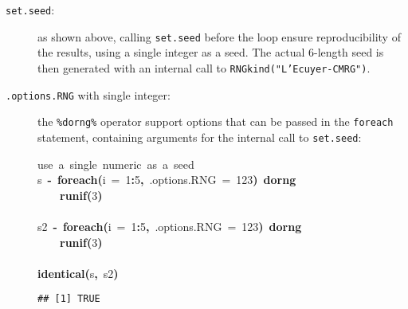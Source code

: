 \documentclass[a4paper,12pt]{article}\usepackage{graphicx, color}
\makeatletter
\newcommand{\hlnumber}[1]{\textcolor[rgb]{0,0,0}{#1}}%
\newcommand{\hlfunctioncall}[1]{\textcolor[rgb]{0.501960784313725,0,0.329411764705882}{\textbf{#1}}}%
\newcommand{\hlkeyword}[1]{\textcolor[rgb]{0,0,0}{\textbf{#1}}}%
\newcommand{\hlargument}[1]{\textcolor[rgb]{0.690196078431373,0.250980392156863,0.0196078431372549}{#1}}%
\newcommand{\hlcomment}[1]{\textcolor[rgb]{0.180392156862745,0.6,0.341176470588235}{#1}}%
\newcommand{\hlassignement}[1]{\textcolor[rgb]{0,0,0}{\textbf{#1}}}%
\newcommand{\hlsymbol}[1]{\textcolor[rgb]{0,0,0}{#1}}%
\newcommand{\hlstd}[1]{\textcolor[rgb]{0,0,0}{#1}}%
\newenvironment{kframe}{%
 \def\FrameCommand##1{\hskip\@totalleftmargin \hskip-\fboxsep
 \colorbox{shadecolor}{##1}\hskip-\fboxsep
     \hskip-\linewidth \hskip-\@totalleftmargin \hskip\columnwidth}%
 \MakeFramed {\advance\hsize-\width
   \@totalleftmargin\z@ \linewidth\hsize
   \@setminipage}}%
 {\par\unskip\endMakeFramed}
\newenvironment{knitrout}{}{} %
\renewenvironment{knitrout}{\begin{footnotesize}}{\end{footnotesize}}
\let\code=\texttt
\newcommand{\dorng}{\code{\%dorng\%}\xspace}
\makeatother
\begin{document}
\begin{description}
  \item[\code{set.seed}:] as shown above, calling \code{set.seed} before the
  loop ensure reproducibility of the results, using a single integer as a seed. 
  The actual 6-length seed is then generated with an internal call to 
  \code{RNGkind("L'Ecuyer-CMRG")}.
  \item[\code{.options.RNG} with single integer:] the \dorng operator
  support options that can be passed in the \code{foreach} statement, containing
  arguments for the internal call to \code{set.seed}:
  
\begin{knitrout}
\color{fgcolor}\begin{kframe}
\begin{flushleft}
\ttfamily\noindent
\hlcomment{\usebox{\hlnormalsizeboxhash}{\ }use{\ }a{\ }single{\ }numeric{\ }as{\ }a{\ }seed}\hspace*{\fill}\\
\hlstd{}\hlsymbol{s}{\ }\hlassignement{\usebox{\hlnormalsizeboxlessthan}-}{\ }\hlfunctioncall{foreach}\hlkeyword{(}\hlargument{i}{\ }\hlargument{=}{\ }\hlnumber{1}\hlkeyword{:}\hlnumber{5}\hlkeyword{,}{\ }\hlargument{.options.RNG}{\ }\hlargument{=}{\ }\hlnumber{123}\hlkeyword{)}{\ }\hlkeyword{\usebox{\hlnormalsizeboxpercent}dorng\usebox{\hlnormalsizeboxpercent}}{\ }\hlkeyword{\usebox{\hlnormalsizeboxopenbrace}}\hspace*{\fill}\\
\hlstd{}{\ }{\ }{\ }{\ }\hlfunctioncall{runif}\hlkeyword{(}\hlnumber{3}\hlkeyword{)}\hspace*{\fill}\\
\hlstd{}\hlkeyword{\usebox{\hlnormalsizeboxclosebrace}}\hspace*{\fill}\\
\hlstd{}\hlsymbol{s2}{\ }\hlassignement{\usebox{\hlnormalsizeboxlessthan}-}{\ }\hlfunctioncall{foreach}\hlkeyword{(}\hlargument{i}{\ }\hlargument{=}{\ }\hlnumber{1}\hlkeyword{:}\hlnumber{5}\hlkeyword{,}{\ }\hlargument{.options.RNG}{\ }\hlargument{=}{\ }\hlnumber{123}\hlkeyword{)}{\ }\hlkeyword{\usebox{\hlnormalsizeboxpercent}dorng\usebox{\hlnormalsizeboxpercent}}{\ }\hlkeyword{\usebox{\hlnormalsizeboxopenbrace}}\hspace*{\fill}\\
\hlstd{}{\ }{\ }{\ }{\ }\hlfunctioncall{runif}\hlkeyword{(}\hlnumber{3}\hlkeyword{)}\hspace*{\fill}\\
\hlstd{}\hlkeyword{\usebox{\hlnormalsizeboxclosebrace}}\hspace*{\fill}\\
\hlstd{}\hlfunctioncall{identical}\hlkeyword{(}\hlsymbol{s}\hlkeyword{,}{\ }\hlsymbol{s2}\hlkeyword{)}\mbox{}
\normalfont
\end{flushleft}
\begin{verbatim}
## [1] TRUE
\end{verbatim}
\end{kframe}
\end{knitrout}



\end{description}
\end{document}
